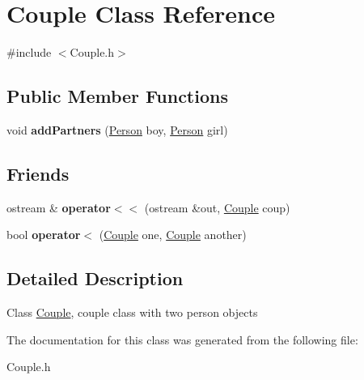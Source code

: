 \hypertarget{class_couple}{\section{Couple Class Reference}
\label{class_couple}
}


{\ttfamily \#include $<$Couple.\-h$>$}

\subsection*{Public Member Functions}
\begin{DoxyCompactItemize}
\item 
\hypertarget{class_couple_a53c0cd79b8a08027de9858e856a56007}{void {\bfseries add\-Partners} (\hyperlink{class_person}{Person} boy, \hyperlink{class_person}{Person} girl)}\label{class_couple_a53c0cd79b8a08027de9858e856a56007}

\end{DoxyCompactItemize}
\subsection*{Friends}
\begin{DoxyCompactItemize}
\item 
\hypertarget{class_couple_aa4d4bf4050cc0367abd9c751b7b9a09f}{ostream \& {\bfseries operator$<$$<$} (ostream \&out, \hyperlink{class_couple}{Couple} coup)}\label{class_couple_aa4d4bf4050cc0367abd9c751b7b9a09f}

\item 
\hypertarget{class_couple_ae5a6878bb0f7d3fc5611a50fbdf08eee}{bool {\bfseries operator$<$} (\hyperlink{class_couple}{Couple} one, \hyperlink{class_couple}{Couple} another)}\label{class_couple_ae5a6878bb0f7d3fc5611a50fbdf08eee}

\end{DoxyCompactItemize}


\subsection{Detailed Description}
Class \hyperlink{class_couple}{Couple}, couple class with two person objects 

The documentation for this class was generated from the following file\-:\begin{DoxyCompactItemize}
\item 
Couple.\-h\end{DoxyCompactItemize}
